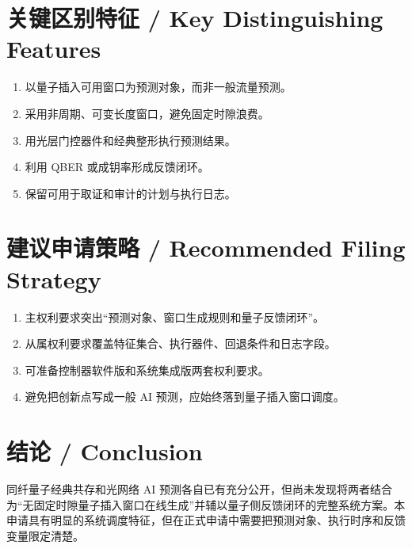 ﻿\documentclass[12pt,a4paper]{article}
\begin{document}
\section{关键区别特征 / Key Distinguishing Features}
\begin{enumerate}
\item 以量子插入可用窗口为预测对象，而非一般流量预测。
\item 采用非周期、可变长度窗口，避免固定时隙浪费。
\item 用光层门控器件和经典整形执行预测结果。
\item 利用 QBER 或成钥率形成反馈闭环。
\item 保留可用于取证和审计的计划与执行日志。
\end{enumerate}

\section{建议申请策略 / Recommended Filing Strategy}
\begin{enumerate}
\item 主权利要求突出“预测对象、窗口生成规则和量子反馈闭环”。
\item 从属权利要求覆盖特征集合、执行器件、回退条件和日志字段。
\item 可准备控制器软件版和系统集成版两套权利要求。
\item 避免把创新点写成一般 AI 预测，应始终落到量子插入窗口调度。
\end{enumerate}

\section{结论 / Conclusion}
同纤量子经典共存和光网络 AI 预测各自已有充分公开，但尚未发现将两者结合为“无固定时隙量子插入窗口在线生成”并辅以量子侧反馈闭环的完整系统方案。本申请具有明显的系统调度特征，但在正式申请中需要把预测对象、执行时序和反馈变量限定清楚。
\end{document}
